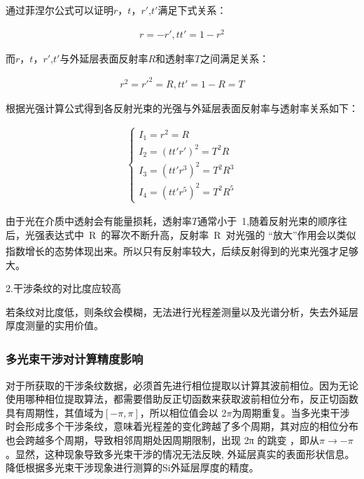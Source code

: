 \documentclass[UTF8]{ctexart}
\begin{document}
通过菲涅尔公式可以证明$r$，$t$，$r'$,$t'$满足下式关系：\par 
\begin{align}
	r=-r',tt'=1-r^2
	\label{e5}
\end{align}\par 
而$r$，$t$，$r'$,$t'$与外延层表面反射率$R$和透射率$T$之间满足关系：\par 
\begin{align}
	r^2=r'^2=R,tt'=1-R=T
	\label{e6}
\end{align}\par 
根据光强计算公式得到各反射光束的光强与外延层表面反射率与透射率关系如下：\par 
\begin{align}
	\begin{cases}
		I_1=r^2=R\\
		I_2=(tt'r')^2=T^2R\\
		I_3=(tt'r^3)^2=T^2R^3\\
		I_4=(tt'r^5)^2=T^2R^5
		\label{e4}
	\end{cases}
\end{align}\par 
由于光在介质中透射会有能量损耗，透射率$T$通常小于 1,随着反射光束的顺序往后，光强表达式中 R 的幂次不断升高，反射率 R 对光强的 “放大”作用会以类似指数增长的态势体现出来\textsuperscript{\cite{5}}。所以只有反射率较大，后续反射得到的光束光强才足够大。\par
2.干涉条纹的对比度应较高\par 
若条纹对比度低，则条纹会模糊，无法进行光程差测量以及光谱分析，失去外延层厚度测量的实用价值。\par 
\subsubsection{多光束干涉对计算精度影响\textsuperscript{\cite{8}}} 
对于所获取的干涉条纹数据，必须首先进行相位提取以计算其波前相位。因为无论使用哪种相位提取算法，都需要借助反正切函数来获取波前相位分布，反正切函数具有周期性，其值域为$[-\pi,\pi]$，所以相位值会以 2$\pi$为周期重复。当多光束干涉时会形成多个干涉条纹，意味着光程差的变化跨越了多个周期，其对应的相位分布也会跨越多个周期，导致相邻周期处因周期限制，出现 2π 的跳变 ，即从$\pi\to-\pi$。显然，这种现象导致多光束干涉的情况无法反映, 外延层真实的表面形状信息。降低根据多光束干涉现象进行测算的Si外延层厚度的精度。\par 
\end{document}
